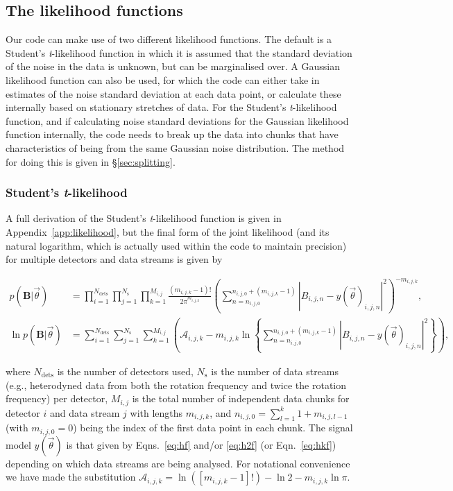 \subsection{The likelihood functions}\label{sec:likelihood}

Our code can make use of two different likelihood functions. The default is a
Student's {\it t}-likelihood function in which it is assumed that the standard deviation of the noise in the
data is unknown, but can be marginalised over. A Gaussian likelihood function can also be used, for
which the code can either take in estimates of the noise standard deviation at each data point, or calculate
these internally based on stationary stretches of data. For the Student's {\it t}-likelihood function, and if
calculating noise standard deviations for the Gaussian likelihood function internally, the code needs to break
up the data into chunks that have characteristics of being from the same Gaussian noise distribution. The method for doing this is
given in \S\ref{sec:splitting}.

\subsubsection{Student's {\it t}-likelihood}\label{sec:stlikelihood}

A full derivation of the Student's {\it t}-likelihood function \citep[see, e.g.,][]{2005PhRvD..72j2002D} is given
in Appendix~\ref{app:likelihood}, but the final form of the joint likelihood (and its natural logarithm,
which is actually used within the code to maintain precision) for multiple detectors and data streams is
given by
\begin{widetext}
\begin{align}\label{eq:stlikelihood}
p(\mathbf{B}|\vec{\theta}) &= \prod_{i=1}^{N_{\text{dets}}} \prod_{j=1}^{N_{\text{s}}} \prod_{k=1}^{M_{i,j}}
\frac{(m_{i,j,k}-1)!}{2\pi^{m_{i,j,k}}}
\left(\sum_{n=n_{i,j,0}}^{n_{i,j,0}+(m_{i,j,k}-1)} |B_{i,j,n}-y(\vec{\theta})_{i,j,n}|^2\right)^{-m_{i,j,k}},
\nonumber \\
\ln{p(\mathbf{B}|\vec{\theta})} &= \sum_{i=1}^{N_{\text{dets}}} \sum_{j=1}^{N_{\text{s}}}
\sum_{k=1}^{M_{i,j}} \left( \mathcal{A}_{i,j,k} - m_{i,j,k}\ln{
\left\{\sum_{n=n_{i,j,0}}^{n_{i,j,0}+(m_{i,j,k}-1)} |B_{i,j,n}-y(\vec{\theta})_{i,j,n}|^2\right\}}
\right),
\end{align}
\end{widetext}
where $N_{\text{dets}}$ is the number of detectors used, $N_{\text{s}}$ is the number of data streams (e.g.,
heterodyned data from both the rotation frequency and twice the rotation frequency) per detector, $M_{i,j}$ is
the total number of independent data chunks for detector $i$ and data stream $j$ with lengths $m_{i,j,k}$, and
$n_{i,j,0} = \sum_{l=1}^{k} 1+m_{i,j,l-1}$ (with $m_{i,j,0} = 0$) being the index of the first data point in
each chunk. The signal model $y(\vec{\theta})$ is that given by Eqns.~\ref{eq:hf} and/or \ref{eq:h2f} (or Eqn.~\ref{eq:hkf})
depending on which data streams are being analysed. For notational convenience we have made the substitution
$\mathcal{A}_{i,j,k} = \ln{\left([m_{i,j,k}-1]!\right)} - \ln{2} - m_{i,j,k}\ln{\pi}$.

